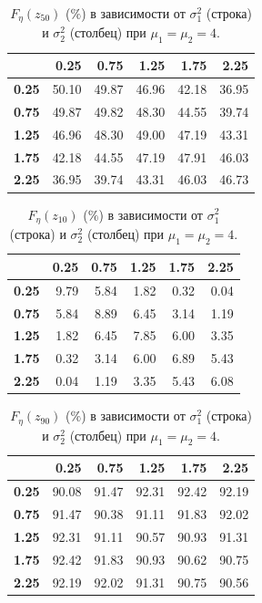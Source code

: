 \documentclass[specialist, substylefile = spbu.rtx,
subf,href,colorlinks=true, 12pt]{disser}
\begin{document}
\begin{table}[!hhh]
	\centering
	\caption{$F_{\eta}(z_{50})$ ($\%$) в зависимости от $\sigma_{1}^{2}$ (строка) и $\sigma_{2}^{2}$ (столбец) при $\mu_{1} = \mu_{2} = 4$. }
	\label{tab4}
	\begin{tabular}{rrrrrr}
		\hline
		& \textbf{0.25} & \textbf{0.75} & \textbf{1.25} & \textbf{1.75} & \textbf{2.25} \\ 
		\hline
		\textbf{0.25} & 50.10 & 49.87 & 46.96 & 42.18 & 36.95 \\ 
		\textbf{0.75} & 49.87 & 49.82 & 48.30 & 44.55 & 39.74 \\ 
		\textbf{1.25} & 46.96 & 48.30 & 49.00 & 47.19 & 43.31 \\ 
		\textbf{1.75} & 42.18 & 44.55 & 47.19 & 47.91 & 46.03 \\ 
		\textbf{2.25} & 36.95 & 39.74 & 43.31 & 46.03 & 46.73 \\ 
		\hline
	\end{tabular}
\end{table}

\begin{table}[!hhh]
	\centering
	\caption{$F_{\eta}(z_{10})$ ($\%$) в зависимости от $\sigma_{1}^{2}$ (строка) и $\sigma_{2}^{2}$ (столбец) при $\mu_{1} = \mu_{2} = 4$. }
	\label{tab5}
	\begin{tabular}{rrrrrr}
		\hline
		& \textbf{0.25} & \textbf{0.75} & \textbf{1.25} & \textbf{1.75} & \textbf{2.25} \\ 
		\hline
		\textbf{0.25} & 9.79 & 5.84 & 1.82 & 0.32 & 0.04 \\ 
		\textbf{0.75} & 5.84 & 8.89 & 6.45 & 3.14 & 1.19 \\ 
		\textbf{1.25} & 1.82 & 6.45 & 7.85 & 6.00 & 3.35 \\ 
		\textbf{1.75} & 0.32 & 3.14 & 6.00 & 6.89 & 5.43 \\ 
		\textbf{2.25} & 0.04 & 1.19 & 3.35 & 5.43 & 6.08 \\ 
		\hline
	\end{tabular}
\end{table}

\begin{table}[!hhh]
	\centering
	\caption{$F_{\eta}(z_{90})$ ($\%$) в зависимости от $\sigma_{1}^{2}$ (строка) и $\sigma_{2}^{2}$ (столбец) при $\mu_{1} = \mu_{2} = 4$.}
	\label{tab6}
	\begin{tabular}{rrrrrr}
		\hline
		& \textbf{0.25} & \textbf{0.75} & \textbf{1.25} & \textbf{1.75} & \textbf{2.25} \\
		\hline
		\textbf{0.25} & 90.08 & 91.47 & 92.31 & 92.42 & 92.19 \\ 
		\textbf{0.75} & 91.47 & 90.38 & 91.11 & 91.83 & 92.02 \\ 
		\textbf{1.25} & 92.31 & 91.11 & 90.57 & 90.93 & 91.31 \\ 
		\textbf{1.75} & 92.42 & 91.83 & 90.93 & 90.62 & 90.75 \\ 
		\textbf{2.25} & 92.19 & 92.02 & 91.31 & 90.75 & 90.56 \\ 
		\hline
	\end{tabular}
\end{table}	
\end{document}
